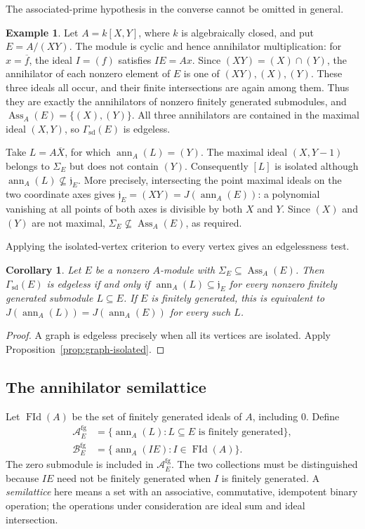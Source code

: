 \documentclass[11pt]{amsart}
\theoremstyle{plain}
\newtheorem{corollary}[theorem]{Corollary}
\theoremstyle{definition}
\newtheorem{example}[theorem]{Example}
\theoremstyle{remark}
\DeclareMathOperator{\Ass}{Ass}
\newcommand{\ann}{\operatorname{ann}}
\newcommand{\FGId}{\operatorname{FId}}
\newcommand{\GammaSD}{\Gamma_{\mathrm{sd}}}
\numberwithin{equation}{section}
\begin{document}
The associated-prime hypothesis in the converse cannot be omitted in general.

\begin{example}\label{ex:isolated-hypothesis}
Let $A=k[X,Y]$, where $k$ is algebraically closed, and put $E=A/(XY)$.
The module is cyclic and hence annihilator multiplication: for
$x=\overline f$, the ideal $I=(f)$ satisfies $IE=Ax$.
Since $(XY)=(X)\cap(Y)$, the annihilator of each nonzero element of $E$
is one of $(XY),(X),(Y)$. These three ideals all occur, and their finite
intersections are again among them. Thus they are exactly the annihilators
of nonzero finitely generated submodules, and
$\Ass_A(E)=\{(X),(Y)\}$.
All three annihilators are contained in the maximal ideal $(X,Y)$, so
$\GammaSD(E)$ is edgeless.

Take $L=A\overline X$, for which $\ann_A(L)=(Y)$.
The maximal ideal $(X,Y-1)$ belongs to $\Sigma_E$ but does not contain $(Y)$.
Consequently $[L]$ is isolated although
$\ann_A(L)\not\subseteq\mathfrak j_E$.
More precisely, intersecting the point maximal ideals on the two coordinate
axes gives $\mathfrak j_E=(XY)=J(\ann_A(E))$:
a polynomial vanishing at all points of both axes is divisible by both
$X$ and $Y$. Since $(X)$ and $(Y)$ are not maximal,
$\Sigma_E\not\subseteq\Ass_A(E)$, as required.
\end{example}

Applying the isolated-vertex criterion to every vertex gives an edgelessness
test.

\begin{corollary}\label{cor:graph-edgeless-support}
Let $E$ be a nonzero $A$-module with $\Sigma_E\subseteq\Ass_A(E)$.
Then $\GammaSD(E)$ is edgeless if and only if
$\ann_A(L)\subseteq\mathfrak j_E$ for every nonzero finitely generated
submodule $L\subseteq E$.
If $E$ is finitely generated, this is equivalent to
$J(\ann_A(L))=J(\ann_A(E))$ for every such $L$.
\end{corollary}

\begin{proof}
A graph is edgeless precisely when all its vertices are isolated.
Apply Proposition~\ref{prop:graph-isolated}.
\end{proof}

\subsection{The annihilator semilattice}

Let $\FGId(A)$ be the set of finitely generated ideals of $A$, including
$0$. Define
\[
\begin{aligned}
\mathcal A_E^{\mathrm{fg}}
 &=\{\ann_A(L):L\subseteq E\text{ is finitely generated}\},\\
\mathcal B_E^{\mathrm{fg}}
 &=\{\ann_A(IE):I\in\FGId(A)\}.
\end{aligned}
\]
The zero submodule is included in $\mathcal A_E^{\mathrm{fg}}$.
The two collections must be distinguished because $IE$ need not be finitely
generated when $I$ is finitely generated. A \emph{semilattice} here means a
set with an associative, commutative, idempotent binary operation; the
operations under consideration are ideal sum and ideal intersection.
\end{document}
